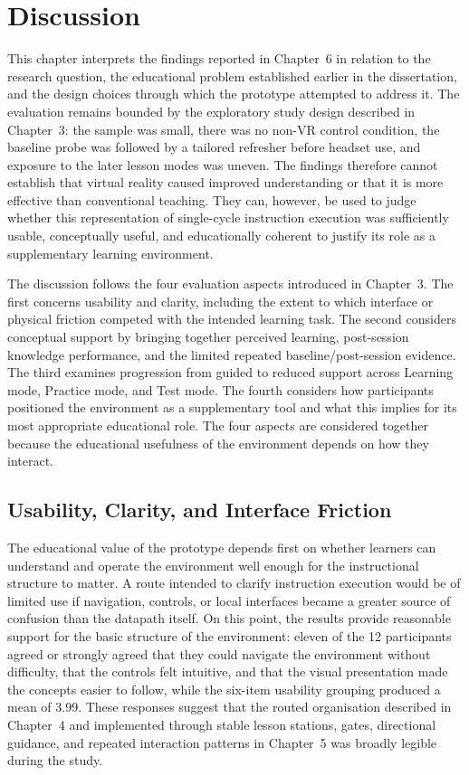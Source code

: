 \chapter{Discussion}

This chapter interprets the findings reported in Chapter~6 in relation to the research question, the educational problem established earlier in the dissertation, and the design choices through which the prototype attempted to address it. The evaluation remains bounded by the exploratory study design described in Chapter~3: the sample was small, there was no non-VR control condition, the baseline probe was followed by a tailored refresher before headset use, and exposure to the later lesson modes was uneven. The findings therefore cannot establish that virtual reality caused improved understanding or that it is more effective than conventional teaching. They can, however, be used to judge whether this representation of single-cycle instruction execution was sufficiently usable, conceptually useful, and educationally coherent to justify its role as a supplementary learning environment.

The discussion follows the four evaluation aspects introduced in Chapter~3. The first concerns usability and clarity, including the extent to which interface or physical friction competed with the intended learning task. The second considers conceptual support by bringing together perceived learning, post-session knowledge performance, and the limited repeated baseline/post-session evidence. The third examines progression from guided to reduced support across Learning mode, Practice mode, and Test mode. The fourth considers how participants positioned the environment as a supplementary tool and what this implies for its most appropriate educational role. The four aspects are considered together because the educational usefulness of the environment depends on how they interact.

\section{Usability, Clarity, and Interface Friction}

The educational value of the prototype depends first on whether learners can understand and operate the environment well enough for the instructional structure to matter. A route intended to clarify instruction execution would be of limited use if navigation, controls, or local interfaces became a greater source of confusion than the datapath itself. On this point, the results provide reasonable support for the basic structure of the environment: eleven of the 12 participants agreed or strongly agreed that they could navigate the environment without difficulty, that the controls felt intuitive, and that the visual presentation made the concepts easier to follow, while the six-item usability grouping produced a mean of 3.99. These responses suggest that the routed organisation described in Chapter~4 and implemented through stable lesson stations, gates, directional guidance, and repeated interaction patterns in Chapter~5 was broadly legible during the study.

